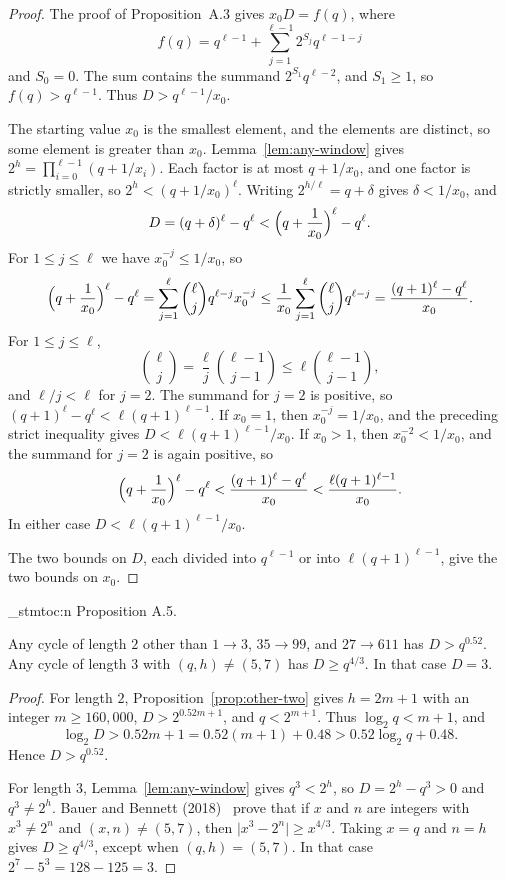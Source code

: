 \documentclass[11pt]{article}
\newenvironment{named}[1]{%
  \par\addvspace{\medskipamount}%
  \pagebreak[3]%
  \noindent{\bfseries #1}\space\ignorespaces
  \stmtoc{#1}%
}{\par\addvspace{\medskipamount}}
\newcommand{\stmtoc}[1]{ \qn_stmtoc:n {#1} }
\begin{document}
\begin{proof}
The proof of Proposition~A.3 gives $x_0 D = f(q)$, where
\[
f(q) = q^{\ell-1} + \sum_{j=1}^{\ell-1} 2^{S_j} q^{\ell-1-j}
\]
and $S_0 = 0$.
The sum contains the summand $2^{S_1} q^{\ell-2}$, and $S_1 \ge 1$, so $f(q) > q^{\ell-1}$.
Thus $D > q^{\ell-1}/x_0$.

The starting value $x_0$ is the smallest element, and the elements are distinct, so some element is greater than $x_0$.
Lemma~\ref{lem:any-window} gives $2^h = \prod_{i=0}^{\ell-1}(q + 1/x_i)$.
Each factor is at most $q + 1/x_0$, and one factor is strictly smaller, so $2^h < (q + 1/x_0)^\ell$.
Writing $2^{h/\ell} = q + \delta$ gives $\delta < 1/x_0$, and
\[
D = (q+\delta)^\ell - q^\ell < \Bigl(q + \frac{1}{x_0}\Bigr)^\ell - q^\ell.
\]
For $1 \le j \le \ell$ we have $x_0^{-j} \le 1/x_0$, so
\[
\Bigl(q + \frac{1}{x_0}\Bigr)^\ell - q^\ell
= \sum_{j=1}^{\ell} \binom{\ell}{j} q^{\ell-j} x_0^{-j}
\le \frac{1}{x_0}\sum_{j=1}^{\ell} \binom{\ell}{j} q^{\ell-j}
= \frac{(q+1)^\ell - q^\ell}{x_0}.
\]
For $1 \le j \le \ell$,
\[
\binom{\ell}{j} = \frac{\ell}{j}\binom{\ell-1}{j-1} \le \ell\binom{\ell-1}{j-1},
\]
and $\ell/j < \ell$ for $j = 2$.
The summand for $j = 2$ is positive, so $(q+1)^\ell - q^\ell < \ell(q+1)^{\ell-1}$.
If $x_0 = 1$, then $x_0^{-j} = 1/x_0$, and the preceding strict inequality gives $D < \ell(q+1)^{\ell-1}/x_0$.
If $x_0 > 1$, then $x_0^{-2} < 1/x_0$, and the summand for $j = 2$ is again positive, so
\[
\Bigl(q + \frac{1}{x_0}\Bigr)^\ell - q^\ell < \frac{(q+1)^\ell - q^\ell}{x_0} < \frac{\ell(q+1)^{\ell-1}}{x_0}.
\]
In either case $D < \ell(q+1)^{\ell-1}/x_0$.

The two bounds on $D$, each divided into $q^{\ell-1}$ or into $\ell(q+1)^{\ell-1}$, give the two bounds on $x_0$.
\end{proof}

\begin{named}{Proposition A.5.}
Any cycle of length $2$ other than $1 \to 3$, $35 \to 99$, and $27 \to 611$ has $D > q^{0.52}$.
Any cycle of length $3$ with $(q, h) \ne (5, 7)$ has $D \ge q^{4/3}$.
In that case $D = 3$.
\end{named}

\begin{proof}
For length $2$, Proposition~\ref{prop:other-two} gives $h = 2m + 1$ with an integer $m \ge 160{,}000$, $D > 2^{0.52 m + 1}$, and $q < 2^{m+1}$.
Thus $\log_2 q < m + 1$, and
\[
\log_2 D > 0.52 m + 1 = 0.52(m + 1) + 0.48 > 0.52\log_2 q + 0.48.
\]
Hence $D > q^{0.52}$.

For length $3$, Lemma~\ref{lem:any-window} gives $q^3 < 2^h$, so $D = 2^h - q^3 > 0$ and $q^3 \ne 2^h$.
Bauer and Bennett (2018)~\cite{bauer-bennett-2018} prove that if $x$ and $n$ are integers with $x^3 \ne 2^n$ and $(x, n) \ne (5, 7)$, then $\lvert x^3 - 2^n \rvert \ge x^{4/3}$.
Taking $x = q$ and $n = h$ gives $D \ge q^{4/3}$, except when $(q, h) = (5, 7)$.
In that case $2^7 - 5^3 = 128 - 125 = 3$.
\end{proof}
\end{document}
